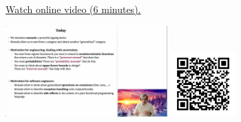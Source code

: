
\begin{minipage}{10cm}
    \href{https://act4e-spring21.netlify.app/videos/spring2021-monads-a:intro-monad.html}{Watch online video (6 minutes).}
        
    \href{https://act4e-spring21.netlify.app/videos/spring2021-monads-a:intro-monad.html}{\includegraphics[height=3.5cm]{spring2021-monads-a:intro-monad/thumbnails.jpg}}
    \href{https://act4e-spring21.netlify.app/videos/spring2021-monads-a:intro-monad.html}{\includegraphics[height=2.5cm]{spring2021-monads-a:intro-monad/qrcode.png}}
\end{minipage}
